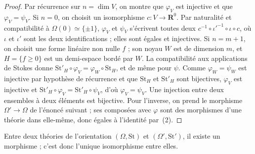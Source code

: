 \begin{proof}
Par récurrence sur $n = \dim V$, on montre que $\varphi_V$ est injective et que $\varphi_V = \psi_V$. Si $n = 0$, on choisit un isomorphisme $c : V \to \mathbf R^0$. Par naturalité et compatibilité à $\Omega(0) \simeq \{\pm 1\}$, $\varphi_V$ et $\psi_V$ s'écrivent toutes deux $c^{-1} \circ \iota'^{-1} \circ \iota \circ c$, où $\iota$ et $\iota'$ sont les deux identifications ; elles sont égales et injectives. Si $n = m + 1$, on choisit une forme linéaire non nulle $f$ ; son noyau $W$ est de dimension $m$, et $H = \{f \geq 0\}$ est un demi-espace bordé par $W$. La compatibilité aux applications de Stokes donne $\mathrm{St}'_H \circ \varphi_V = \varphi_W \circ \mathrm{St}_H$, et de même pour $\psi$. Comme $\varphi_W = \psi_W$ est injective par hypothèse de récurrence et que $\mathrm{St}_H$ et $\mathrm{St}'_H$ sont bijectives, $\varphi_V$ est injective et $\mathrm{St}'_H \circ \varphi_V = \mathrm{St}'_H \circ \psi_V$, d'où $\varphi_V = \psi_V$. Une injection entre deux ensembles à deux éléments est bijective. Pour l'inverse, on prend le morphisme $\Omega' \to \Omega$ de l'énoncé suivant ; ses composées avec $\varphi$ sont des morphismes d'une théorie dans elle-même, donc égales à l'identité par~(2).
\end{proof}

\begin{enonce}
Entre deux théories de l'orientation $(\Omega, \mathrm{St})$ et $(\Omega', \mathrm{St}')$, il existe un morphisme ; c'est donc l'unique isomorphisme entre elles.
\end{enonce}

